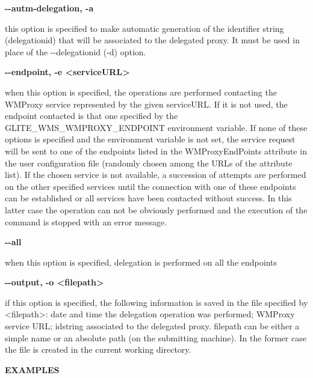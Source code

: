 \textbf{-{}-autm-delegation, -a}

this option is specified to make automatic generation of the identifier string (delegationid) that will be associated to the delegated proxy. It
must be used in place of the -{}-delegationid (-d) option.





\textbf{-{}-endpoint, -e <serviceURL>}

when this option is specified, the operations are performed contacting the WMProxy service represented by the given serviceURL. If it is not used, the endpoint contacted is that one specified by the GLITE\_WMS\_WMPROXY\_ENDPOINT environment variable. If none of these options is specified and the environment variable is not set, the service request will be sent to one of the endpoints listed in the WMProxyEndPoints attribute in the user configuration file (randomly chosen among the URLs of the attribute list). If the chosen service is not available, a succession of attempts are performed on the other specified services until the connection with one of these endpoints can be established or all services have been contacted without success. In this latter case the operation can not be obviously performed and the execution of the command is stopped with an error message.




\textbf{-{}-all}

when this option is specified, delegation is performed on all the endpoints




\textbf{-{}-output, -o <filepath>}

if this option is specified, the following information is saved in the file specified by <filepath>: date and time the delegation operation was performed; WMProxy service URL;  idstring associated to the delegated proxy. filepath can be either a simple name or an absolute path (on the submitting machine). In the former case the file is created in the current working directory.





\medskip
\textbf{EXAMPLES}
\smallskip


